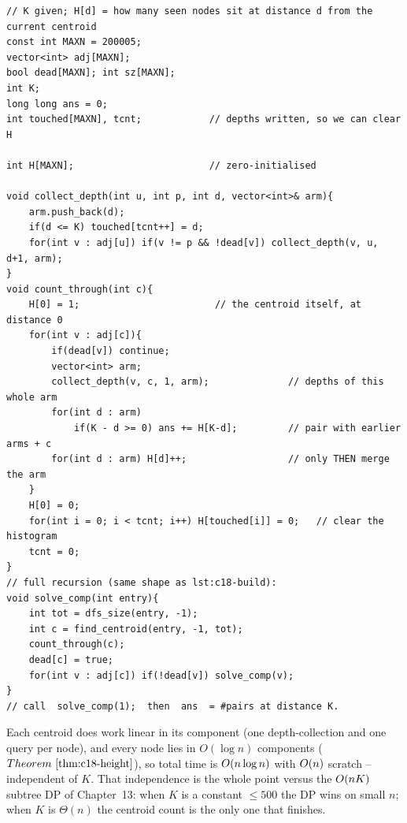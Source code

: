 \begin{lstlisting}[caption={Count unordered pairs at distance exactly K over a fixed tree by centroid decomposition: at each centroid, query-then-merge a depth histogram across the child arms so same-child pairs are never formed here. Reuses the deleted marker and find-centroid from lst:c18-build. ASCII only}, label={lst:c18-count}]
// K given; H[d] = how many seen nodes sit at distance d from the current centroid
const int MAXN = 200005;
vector<int> adj[MAXN];
bool dead[MAXN]; int sz[MAXN];
int K;
long long ans = 0;
int touched[MAXN], tcnt;            // depths written, so we can clear H

int H[MAXN];                        // zero-initialised

void collect_depth(int u, int p, int d, vector<int>& arm){
    arm.push_back(d);
    if(d <= K) touched[tcnt++] = d;
    for(int v : adj[u]) if(v != p && !dead[v]) collect_depth(v, u, d+1, arm);
}
void count_through(int c){
    H[0] = 1;                        // the centroid itself, at distance 0
    for(int v : adj[c]){
        if(dead[v]) continue;
        vector<int> arm;
        collect_depth(v, c, 1, arm);              // depths of this whole arm
        for(int d : arm)
            if(K - d >= 0) ans += H[K-d];         // pair with earlier arms + c
        for(int d : arm) H[d]++;                  // only THEN merge the arm
    }
    H[0] = 0;
    for(int i = 0; i < tcnt; i++) H[touched[i]] = 0;   // clear the histogram
    tcnt = 0;
}
// full recursion (same shape as lst:c18-build):
void solve_comp(int entry){
    int tot = dfs_size(entry, -1);
    int c = find_centroid(entry, -1, tot);
    count_through(c);
    dead[c] = true;
    for(int v : adj[c]) if(!dead[v]) solve_comp(v);
}
// call  solve_comp(1);  then  ans  = #pairs at distance K.
\end{lstlisting}

\begin{complexitybox}
Each centroid does work linear in its component (one depth-collection and one
query per node), and every node lies in \(O(\log n)\) components
(\(\thmref{c18-height}\)), so total time is \(O(n\log n)\) with
\(O(n)\) scratch -- independent of \(K\). That independence is the whole
point versus the \(O(nK)\) subtree DP of Chapter~13: when \(K\) is a
constant \(\le 500\) the DP wins on small \(n\); when \(K\) is \(\Theta(n)\) the
centroid count is the only one that finishes.
\end{complexitybox}

